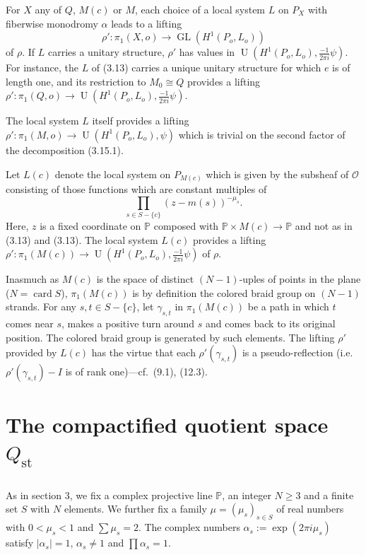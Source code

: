 \documentclass[12pt,a4paper]{article}
\theoremstyle{plain}
\theoremstyle{definition}
\theoremstyle{remark}
\DeclareMathOperator{\card}{card}
\DeclareMathOperator{\GL}{GL}
\newcommand{\PP}{\mathbb{P}}
\numberwithin{equation}{section}
\providecommand{\PP}{\mathbb{P}}
\providecommand{\GL}{\operatorname{GL}}
\providecommand{\U}{\operatorname{U}}
\begin{document}
For $X$ any of $Q$, $M(c)$ or $M$, each choice of a local system $L$ on $P_X$ with fiberwise monodromy $\alpha$ leads to a lifting
\[
\rho': \pi_1(X, o) \to \GL(H^1(P_o, L_o))
\]
of $\rho$. If $L$ carries a unitary structure, $\rho'$ has values in $\U(H^1(P_o, L_o), \frac{-1}{2\pi i}\psi)$. For instance, the $L$ of (3.13) carries a unique unitary structure for which $e$ is of length one, and its restriction to $M_0 \cong Q$ provides a lifting $\rho': \pi_1(Q, o) \to \U(H^1(P_o, L_o), \frac{-1}{2\pi i}\psi)$.

The local system $L$ itself provides a lifting $\rho': \pi_1(M, o) \to \U(H^1(P_o, L_o), \psi)$ which is trivial on the second factor of the decomposition (3.15.1).

Let $L(c)$ denote the local system on $P_{M(c)}$ which is given by the subsheaf of $\mathcal{O}$ consisting of those functions which are constant multiples of
\[
\prod_{s \in S - \{c\}} (z - m(s))^{-\mu_s}.
\]
Here, $z$ is a fixed coordinate on $\PP$ composed with $\PP \times M(c) \to \PP$ and not as in (3.13) and (3.13). The local system $L(c)$ provides a lifting $\rho': \pi_1(M(c)) \to \U(H^1(P_o, L_o), \frac{-1}{2\pi i}\psi)$ of $\rho$.

Inasmuch as $M(c)$ is the space of distinct $(N-1)$-uples of points in the plane ($N = \card S$), $\pi_1(M(c))$ is by definition the colored braid group on $(N-1)$ strands. For any $s, t \in S - \{c\}$, let $\gamma_{s,t}$ in $\pi_1(M(c))$ be a path in which $t$ comes near $s$, makes a positive turn around $s$ and comes back to its original position. The colored braid group is generated by such elements. The lifting $\rho'$ provided by $L(c)$ has the virtue that each $\rho'(\gamma_{s,t})$ is a pseudo-reflection (i.e.\ $\rho'(\gamma_{s,t}) - I$ is of rank one)---cf.\ (9.1), (12.3).


\section{The compactified quotient space $Q_{\mathrm{st}}$}

\subsection{}
As in section 3, we fix a complex projective line $\PP$, an integer $N \geq 3$ and a finite set $S$ with $N$ elements. We further fix a family $\mu = (\mu_s)_{s \in S}$ of real numbers with $0 < \mu_s < 1$ and $\sum \mu_s = 2$. The complex numbers $\alpha_s := \exp(2\pi i \mu_s)$ satisfy $|\alpha_s| = 1$, $\alpha_s \neq 1$ and $\prod \alpha_s = 1$.
\end{document}
